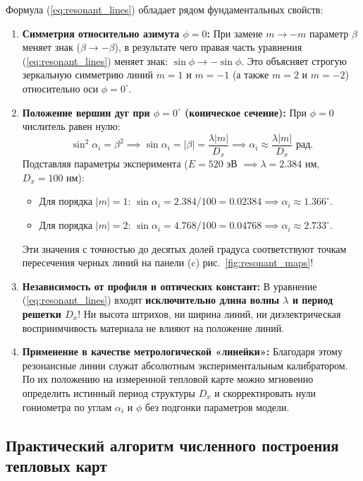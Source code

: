 \documentclass[a4paper,11pt]{article}
\begin{document}
Формула (\ref{eq:resonant_lines}) обладает рядом фундаментальных свойств:
\begin{enumerate}
    \item \textbf{Симметрия относительно азимута $\phi = 0$:} При замене $m \to -m$ параметр $\beta$ меняет знак ($\beta \to -\beta$), в результате чего правая часть уравнения (\ref{eq:resonant_lines}) меняет знак: $\sin\phi \to -\sin\phi$. Это объясняет строгую зеркальную симметрию линий $m = 1$ и $m = -1$ (а также $m = 2$ и $m = -2$) относительно оси $\phi = 0^\circ$.
    \item \textbf{Положение вершин дуг при $\phi = 0^\circ$ (коническое сечение):}
    При $\phi = 0$ числитель равен нулю:
    \begin{equation}
        \sin^2\alpha_i = \beta^2 \implies \sin\alpha_i = |\beta| = \frac{\lambda |m|}{D_x} \implies \alpha_i \approx \frac{\lambda |m|}{D_x} \text{ рад}.
    \end{equation}
    Подставляя параметры эксперимента ($E = 520$ эВ $\implies \lambda = 2.384$ нм, $D_x = 100$ нм):
    \begin{itemize}
        \item Для порядка $|m| = 1$: $\sin\alpha_i = 2.384 / 100 = 0.02384 \implies \alpha_i \approx 1.366^\circ$.
        \item Для порядка $|m| = 2$: $\sin\alpha_i = 4.768 / 100 = 0.04768 \implies \alpha_i \approx 2.733^\circ$.
    \end{itemize}
    Эти значения с точностью до десятых долей градуса соответствуют точкам пересечения черных линий на панели (c) рис.~\ref{fig:resonant_maps}!
    \item \textbf{Независимость от профиля и оптических констант:} В уравнение (\ref{eq:resonant_lines}) входят \textbf{исключительно длина волны $\lambda$ и период решетки $D_x$}! Ни высота штрихов, ни ширина линий, ни диэлектрическая восприимчивость материала не влияют на положение линий.
    \item \textbf{Применение в качестве метрологической «линейки»:} Благодаря этому резонансные линии служат абсолютным экспериментальным калибратором. По их положению на измеренной тепловой карте можно мгновенно определить истинный период структуры $D_x$ и скорректировать нули гониометра по углам $\alpha_i$ и $\phi$ без подгонки параметров модели.
\end{enumerate}

\subsection{Практический алгоритм численного построения тепловых карт}
\end{document}
